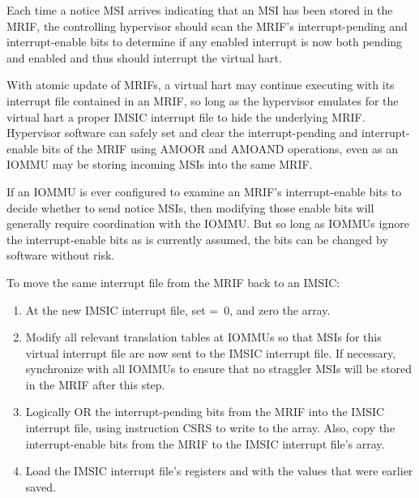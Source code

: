 Each time a notice MSI arrives indicating that an MSI has been
stored in the MRIF, the controlling hypervisor should scan the MRIF's
interrupt-pending and interrupt-enable bits to determine if any enabled
interrupt is now both pending and enabled and thus should interrupt the
virtual hart.

With atomic update of MRIFs, a virtual hart may continue executing
with its interrupt file contained in an MRIF, so long as the hypervisor
emulates for the virtual hart a proper IMSIC interrupt file to hide the
underlying MRIF.
Hypervisor software can safely set and clear the interrupt-pending and
interrupt-enable bits of the MRIF using AMOOR and AMOAND operations,
even as an \mbox{IOMMU} may be storing incoming MSIs into the same MRIF.

\begin{commentary}
If an \mbox{IOMMU} is ever configured to examine an MRIF's interrupt-enable
bits to decide whether to send notice MSIs, then modifying those enable
bits will generally require coordination with the \mbox{IOMMU}.
But so long as \mbox{IOMMU}s ignore the interrupt-enable bits as is
currently assumed, the bits can be changed by software without risk.
\end{commentary}

To move the same interrupt file from the MRIF back to an IMSIC:
\begin{enumerate}

\item
At the new IMSIC interrupt file, set  =~0, and zero the
 array.

\item
Modify all relevant translation tables at \mbox{IOMMU}s so that MSIs for
this virtual interrupt file are now sent to the IMSIC interrupt file.
If necessary, synchronize with all \mbox{IOMMU}s to ensure that no straggler
MSIs will be stored in the MRIF after this step.

\item
Logically OR the interrupt-pending bits from the MRIF into the IMSIC
interrupt file, using instruction CSRS to write to the  array.
Also, copy the interrupt-enable bits from the MRIF to the IMSIC
interrupt file's  array.

\item
Load the IMSIC interrupt file's registers  and
 with the values that were earlier saved.

\end{enumerate}

